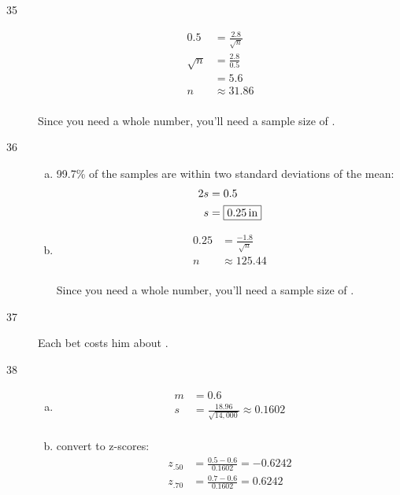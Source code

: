 \documentclass[letterpaper]{exam}
\newcommand{\cent}{\textcent\xspace}
\begin{document}
\begin{description}
      \item[35]
        \begin{align*}
          0.5      & = \frac{2.8}{\sqrt{n}} \\
          \sqrt{n} & = \frac{2.8}{0.5} \\
                   & = 5.6 \\
          n        & \approx 31.86 \\
        \end{align*}

        Since you need a whole number, you'll need a sample size of 
        .

      \item[36]
        \begin{enumerate}[(a)]
          \item 99.7\% of the samples are within two standard deviations of the
            mean:
            \begin{align*}
              2s & = 0.5 \\
              s  & = \boxed{ \unit[0.25]{in} } \\
            \end{align*}

          \item 
            \begin{align*}
              0.25 & = \frac{-1.8}{\sqrt{n}} \\
              n    & \approx 125.44 \\
            \end{align*}

            Since you need a whole number, you'll need a sample size of 
            .
        \end{enumerate}

      \item[37] Each bet costs him about \fbox{ 40\cent }.

      \item[38]
        \begin{enumerate}[(a)]
          \item 
            \begin{align*}
              m &= \boxed{ 0.6 } \\
              s &= \frac{18.96}{\sqrt{14,000}} \approx \boxed{ 0.1602 } \\
            \end{align*}
            
          \item
            convert to z-scores:
            \begin{align*}
              z_{.50} &= \frac{0.5 - 0.6}{0.1602} = -0.6242 \\
              z_{.70} &= \frac{0.7 - 0.6}{0.1602} = 0.6242 \\
            \end{align*}


\end{enumerate}
\end{description}
\end{document}
